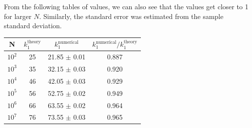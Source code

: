 From the following tables of values, we can also see that the values get closer to 1 for larger $N$. Similarly, the standard error was estimated from the sample standard deviation. 

\begin{center}
\begin{tabular}{ ||c | c | c | c ||}
\hline
N & $k_1^{\text{theory}}$ & $k_1^{\text{numerical}}$ & $k_1^{\text{numerical}} / k_1^{\text{theory}} $\\ 
\hline
$10^2$ & 25    & 21.85  $\pm$ 0.01 & 0.887 \\  
$10^3$ & 35   & 32.15 $\pm$ 0.03 & 0.920 \\
$10^4$ & 46   & 42.05   $\pm$  0.03  & 0.929 \\
$10^5$ & 56  & 52.75  $\pm$  0.02  & 0.949 \\
$10^6$ & 66  & 63.55  $\pm$  0.02  & 0.964 \\
$10^7$ & 76 & 73.55 $\pm$ 0.03  & 0.965 \\  
\hline
\end{tabular}
\label{table:ra-numerical-theoretical-ratio}
\end{center}
